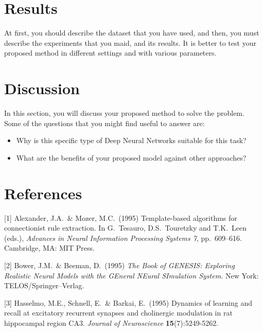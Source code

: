 \documentclass{article}
\begin{document}
\section{Results}
At first, you should describe the dataset that you have used, and then, you must describe the experiments that you maid, and its results. It is better to test your proposed method in different settings and with various parameters.

\section{Discussion}
In this section, you will discuss your proposed method to solve the problem. Some of the questions that you might find useful to answer are:
\begin{itemize}
    \item Why is this specific type of Deep Neural Networks suitable for this task?
    \item What are the benefits of your proposed model against other approaches?
\end{itemize}

\section*{References}

\medskip

\small

[1] Alexander, J.A.\ \& Mozer, M.C.\ (1995) Template-based algorithms for
connectionist rule extraction. In G.\ Tesauro, D.S.\ Touretzky and T.K.\ Leen
(eds.), {\it Advances in Neural Information Processing Systems 7},
pp.\ 609--616. Cambridge, MA: MIT Press.

[2] Bower, J.M.\ \& Beeman, D.\ (1995) {\it The Book of GENESIS: Exploring
  Realistic Neural Models with the GEneral NEural SImulation System.}  New York:
TELOS/Springer--Verlag.

[3] Hasselmo, M.E., Schnell, E.\ \& Barkai, E.\ (1995) Dynamics of learning and
recall at excitatory recurrent synapses and cholinergic modulation in rat
hippocampal region CA3. {\it Journal of Neuroscience} {\bf 15}(7):5249-5262.
\end{document}
